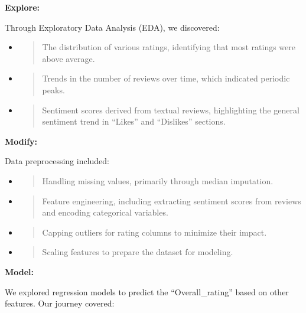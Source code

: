 \documentclass[
]{article}
\begin{document}
\textbf{Explore:}

Through Exploratory Data Analysis (EDA), we discovered:

\begin{itemize}
\item
  \begin{quote}
  The distribution of various ratings, identifying that most ratings
  were above average.
  \end{quote}
\item
  \begin{quote}
  Trends in the number of reviews over time, which indicated periodic
  peaks.
  \end{quote}
\item
  \begin{quote}
  Sentiment scores derived from textual reviews, highlighting the
  general sentiment trend in ``Likes'' and ``Dislikes'' sections.
  \end{quote}
\end{itemize}

\textbf{Modify:}

Data preprocessing included:

\begin{itemize}
\item
  \begin{quote}
  Handling missing values, primarily through median imputation.
  \end{quote}
\item
  \begin{quote}
  Feature engineering, including extracting sentiment scores from
  reviews and encoding categorical variables.
  \end{quote}
\item
  \begin{quote}
  Capping outliers for rating columns to minimize their impact.
  \end{quote}
\item
  \begin{quote}
  Scaling features to prepare the dataset for modeling.
  \end{quote}
\end{itemize}

\textbf{Model:}

We explored regression models to predict the ``Overall\_rating'' based
on other features. Our journey covered:
\end{document}
